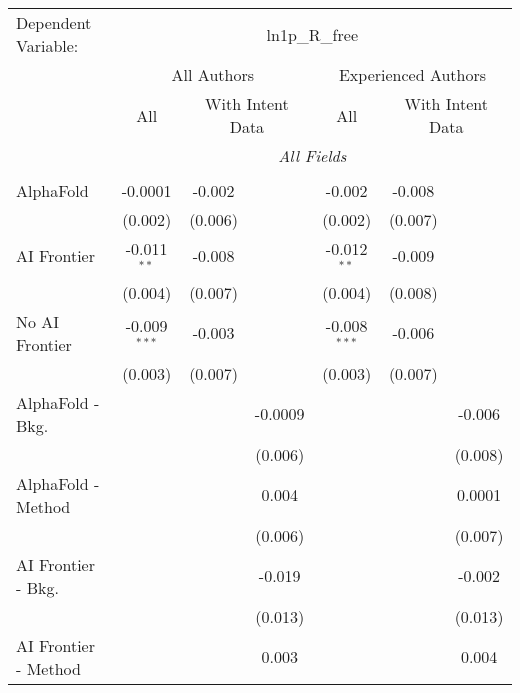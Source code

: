 \begingroup
\centering
\begin{tabular}{lcccccc}
   \tabularnewline \midrule \midrule
   Dependent Variable: & \multicolumn{6}{c}{ln1p\_R\_free}\\
 & \multicolumn{3}{c}{All Authors} & \multicolumn{3}{c}{Experienced Authors} \\
\cmidrule(lr){2-4} \cmidrule(lr){5-7}
 & \multicolumn{1}{c}{All} & \multicolumn{2}{c}{With Intent Data} & \multicolumn{1}{c}{All} & \multicolumn{2}{c}{With Intent Data} \\
\cmidrule(lr){2-2} \cmidrule(lr){3-4} \cmidrule(lr){5-5} \cmidrule(lr){6-7}
 & \multicolumn{6}{c}{\textit{All Fields}} \\ \\
   AlphaFold               & -0.0001        & -0.002  &         & -0.002         & -0.008  &   \\   
                           & (0.002)        & (0.006) &         & (0.002)        & (0.007) &   \\   
   AI Frontier             & -0.011$^{**}$  & -0.008  &         & -0.012$^{**}$  & -0.009  &   \\   
                           & (0.004)        & (0.007) &         & (0.004)        & (0.008) &   \\   
   No AI Frontier          & -0.009$^{***}$ & -0.003  &         & -0.008$^{***}$ & -0.006  &   \\   
                           & (0.003)        & (0.007) &         & (0.003)        & (0.007) &   \\   
   AlphaFold - Bkg.        &                &         & -0.0009 &                &         & -0.006\\   
                           &                &         & (0.006) &                &         & (0.008)\\   
   AlphaFold - Method      &                &         & 0.004   &                &         & 0.0001\\   
                           &                &         & (0.006) &                &         & (0.007)\\   
   AI Frontier - Bkg.      &                &         & -0.019  &                &         & -0.002\\   
                           &                &         & (0.013) &                &         & (0.013)\\   
   AI Frontier - Method    &                &         & 0.003   &                &         & 0.004\\   

\end{tabular}
